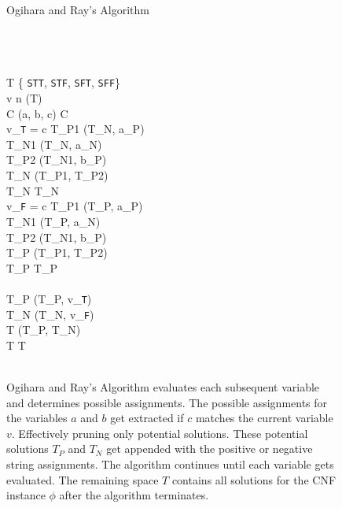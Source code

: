 
\begin{figure}[htbp]
\begin{center}

	\begin{pseudocode}{Ogihara and Ray's Algorithm}{\phi}
	
	\\
	\\
	\\
	T \GETS \{ \texttt{STT}, \texttt{STF}, \texttt{SFT},  \texttt{SFF}\} \\
	
	\FOR v   n \DO
		\BEGIN
		[T_P, T_N] \GETS {}(T)\\
	
		\FOREACH {} C  \phi \DO
			\BEGIN
				(a, b, c) \GETS C\\
				\IF v_{\texttt{T}} = c  \THEN
					\BEGIN
						T_{P1} \GETS {}(T_N, a_P)\\
						T_{N1} \GETS {}(T_N, a_N)\\				
						T_{P2} \GETS {}(T_{N1}, b_P)\\
						T_{N} \GETS {}(T_{P1}, T_{P2})\\
						T_{N} \GETS {}T_{N}\text{)}					
					\END \\  
				\IF v_{\texttt{F}} = c \THEN
					\BEGIN
						T_{P1} \GETS {}(T_P, a_P)\\
						T_{N1} \GETS {}(T_P, a_N)\\				
						T_{P2} \GETS {}(T_{N1}, b_P)\\
						T_{P} \GETS {}(T_{P1}, T_{P2})\\
						T_{P} \GETS {}T_{P}\text{)} 						
					\END\\
			\END\\
			T_P \GETS {}(T_P, v_{\texttt{T}})\\
			T_N \GETS {}(T_N, v_{\texttt{F}})\\
			T \GETS {}(T_P, T_N)\\
			T \GETS {}T\text{)} \\									
		\END\\
	\end{pseudocode}

\caption{{\sc Ogihara and Ray's Algorithm} evaluates each subsequent variable and determines possible assignments.  The possible assignments for the variables $a$ and $b$ get extracted if $c$ matches the current variable $v$.  Effectively pruning only potential solutions.  These potential solutions $T_P$ and $T_N$ get appended with the positive or negative string assignments.  The algorithm continues until each variable gets evaluated.  The remaining space $T$ contains all solutions for the CNF instance $\phi$ after the algorithm terminates.}
\label{ogiharaRayAlgorithm}
\end{center}
\end{figure}
